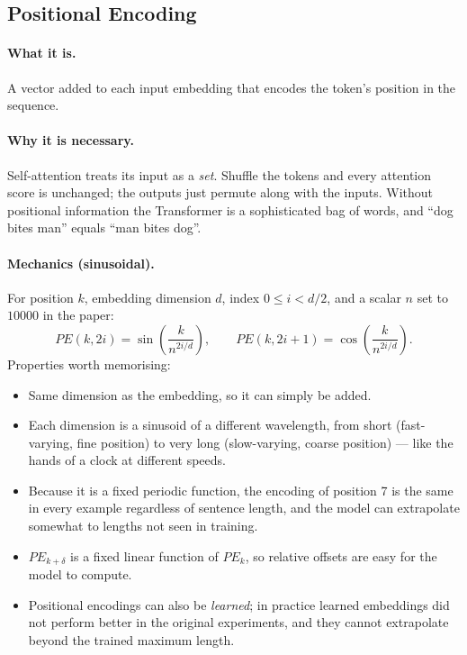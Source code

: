 \documentclass[11pt,a4paper]{article}
\begin{document}
\subsection{Positional Encoding}

\paragraph{What it is.} A vector added to each input embedding that encodes the token's
position in the sequence.

\paragraph{Why it is necessary.} Self-attention treats its input as a \emph{set}. Shuffle
the tokens and every attention score is unchanged; the outputs just permute along with the
inputs. Without positional information the Transformer is a sophisticated bag of words, and
``dog bites man'' equals ``man bites dog''.

\paragraph{Mechanics (sinusoidal).} For position $k$, embedding dimension $d$, index
$0 \le i < d/2$, and a scalar $n$ set to $10000$ in the paper:
\[
PE(k, 2i) = \sin\!\left(\frac{k}{n^{2i/d}}\right), \qquad
PE(k, 2i+1) = \cos\!\left(\frac{k}{n^{2i/d}}\right).
\]
Properties worth memorising:
\begin{itemize}
\item Same dimension as the embedding, so it can simply be added.
\item Each dimension is a sinusoid of a different wavelength, from short (fast-varying, fine
  position) to very long (slow-varying, coarse position) --- like the hands of a clock at
  different speeds.
\item Because it is a fixed periodic function, the encoding of position 7 is the same in
  every example regardless of sentence length, and the model can extrapolate somewhat to
  lengths not seen in training.
\item $PE_{k+\delta}$ is a fixed linear function of $PE_k$, so relative offsets are easy for
  the model to compute.
\item Positional encodings can also be \emph{learned}; in practice learned embeddings did
  not perform better in the original experiments, and they cannot extrapolate beyond the
  trained maximum length.
\end{itemize}
\end{document}
